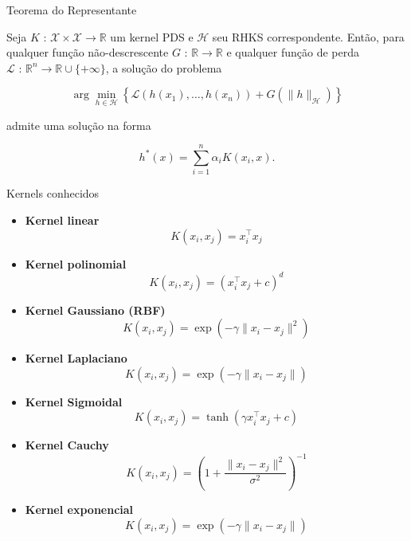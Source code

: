 \documentclass[aspectratio=169,t,xcolor=table]{beamer}
\begin{document}
\begin{frame}{Teorema do Representante}


Seja $K\text{ : } \mathcal{X} \times \mathcal{X} \to \mathbb{R}$ um kernel PDS e $\mathcal{H}$
seu RHKS correspondente. Então, para qualquer função não-descrescente $G\text{ : } \mathbb{R} \to \mathbb{R}$
e qualquer função de perda $\mathcal{L}\text{ : } \mathbb{R}^n \to \mathbb{R} \cup \{+\infty\}$, a solução do problema

\[
\arg\min_{h\in \mathcal{H}} \left\{ \mathcal{L}(h(x_1), \dots, h(x_n)) + G(\|h\|_{\mathcal{H}}) \right\}
\]


admite uma solução na forma

\[
h^*(x)=\sum_{i=1}^{n}\alpha_i K(x_i,x)\text{.}
\]

\end{frame}

\begin{frame}{Kernels conhecidos}
\scriptsize
\begin{itemize}

    \item \textbf{Kernel linear}
    \[
    K(x_i,x_j)=x_i^\top x_j
    \]

    \item \textbf{Kernel polinomial}
    \[
    K(x_i,x_j)=\left(x_i^\top x_j + c\right)^d
    \]

    \item \textbf{Kernel Gaussiano (RBF)}
    \[
    K(x_i,x_j)=\exp\left(-\gamma \|x_i-x_j\|^2\right)
    \]

    \item \textbf{Kernel Laplaciano}
    \[
    K(x_i,x_j)=\exp\left(-\gamma \|x_i-x_j\|\right)
    \]

    \item \textbf{Kernel Sigmoidal}
    \[
    K(x_i,x_j)=\tanh\left(\gamma x_i^\top x_j + c\right)
    \]

    \item \textbf{Kernel Cauchy}
    \[
    K(x_i,x_j)=\left(1+\frac{\|x_i-x_j\|^2}{\sigma^2}\right)^{-1}
    \]

    \item \textbf{Kernel exponencial}
    \[
    K(x_i,x_j)=\exp\left(-\gamma \|x_i-x_j\|\right)
    \]
\end{itemize}
\end{frame}
\end{document}
